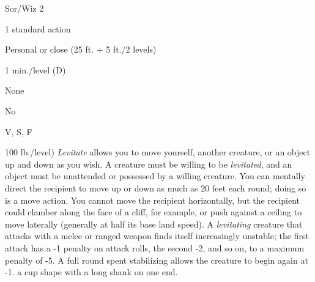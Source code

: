 
\begin{description*}
\item[Level:] Sor/Wiz 2
\item[Casting Time:] 1 standard action
\item[Range:] Personal or close (25 ft. + 5 ft./2 levels)
\item[Duration:] 1 min./level (D)
\item[Saving Throw:] None
\item[Spell Resistance:] No
\item[Components:] V, S, F
\end{description*}

100 lb./level)
\textit{Levitate} allows you to move yourself, another creature, or an object up
and down as you wish. A creature must be willing to be \textit{levitated}, and
an object must be unattended or possessed by a willing creature. You can mentally
direct the recipient to move up or down as much as 20 feet each round; doing so
is a move action. You cannot move the recipient horizontally, but the recipient
could clamber along the face of a cliff, for example, or push against a ceiling
to move laterally (generally at half its base land speed).
A \textit{levitating} creature that attacks with a melee or ranged weapon finds
itself increasingly unstable; the first attack has a -1 penalty on attack rolls,
the second -2, and so on, to a maximum penalty of -5. A full round spent stabilizing
allows the creature to begin again at -1.
a cup shape with a long shank on one end.